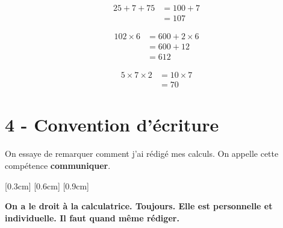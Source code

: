 \documentclass[11pt]{article}
\begin{document}
\begin{minipage}[t]{0.33\textwidth}
\begin{align*}
25 + 7 + 75 &= 100 + 7  \\
            &= 107
\end{align*}

\end{minipage}
\begin{minipage}[t]{0.33\textwidth}

\begin{align*}
102 \times 6 &= 600 + 2 \times 6 \\
             &= 600 + 12 \\
             &= 612
\end{align*}

\end{minipage}
\begin{minipage}[t]{0.33\textwidth}

\begin{align*}
5 \times 7 \times 2 &= 10 \times 7 \\
                    &= 70
\end{align*}
\end{minipage}

\section*{4 - Convention d'écriture}

On essaye de remarquer comment j'ai rédigé mes calculs. On appelle cette compétence \textbf{communiquer}.

\begin{center}\reversemarginpar\marginnote{$\Box \Box$}
\reversemarginpar\marginnote{$\Box \Box$}[0.3cm]
\reversemarginpar\marginnote{$\Box \Box$}[0.6cm]
\reversemarginpar\marginnote{$\Box \Box$}[0.9cm]
\end{center}

\textbf{On a le droit à la calculatrice. Toujours. Elle est personnelle et individuelle. Il faut quand même rédiger.}
\end{document}
